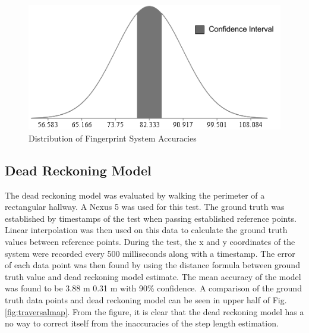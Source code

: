 \documentclass[conference]{IEEEtran}
\begin{document}
\begin{figure}[h]
\centering
\includegraphics[scale=0.65]{Normal_Distribution.png}
\caption{Distribution of Fingerprint System Accuracies}
\captionsetup{justification=centering,margin=2cm}
\label{fig:fingerprintdistribution}
\end{figure}

\subsection{Dead Reckoning Model}

The dead reckoning model was evaluated by walking the perimeter of a rectangular hallway. A Nexus 5 was used for this test. The ground truth was established by timestamps of the test when passing established reference points. Linear interpolation was then used on this data to calculate the ground truth values between reference points. During the test, the x and y coordinates of the system were recorded every 500 milliseconds along with a timestamp. The error of each data point was then found by using the distance formula between ground truth value and dead reckoning model estimate. The mean accuracy of the model was found to be 3.88 m  0.31 m with 90\% confidence. A comparison of the ground truth data points and dead reckoning model can be seen in upper half of Fig. \ref{fig:traversalmap}. From the figure, it is clear that the dead reckoning model has a no way to correct itself from the inaccuracies of the step length estimation.
\end{document}
